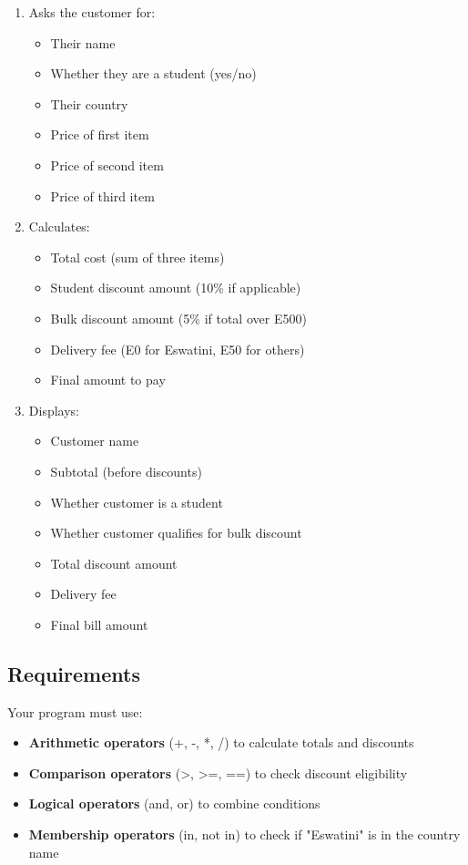 \documentclass[a4paper,11pt]{article}
\theoremstyle{mytheor}
\begin{document}
\begin{enumerate}
    \item Asks the customer for:
    \begin{itemize}
        \item Their name
        \item Whether they are a student (yes/no)
        \item Their country
        \item Price of first item
        \item Price of second item
        \item Price of third item
    \end{itemize}
    
    \item Calculates:
    \begin{itemize}
        \item Total cost (sum of three items)
        \item Student discount amount (10\% if applicable)
        \item Bulk discount amount (5\% if total over E500)
        \item Delivery fee (E0 for Eswatini, E50 for others)
        \item Final amount to pay
    \end{itemize}
    
    \item Displays:
    \begin{itemize}
        \item Customer name
        \item Subtotal (before discounts)
        \item Whether customer is a student
        \item Whether customer qualifies for bulk discount
        \item Total discount amount
        \item Delivery fee
        \item Final bill amount
    \end{itemize}
\end{enumerate}

\subsection*{Requirements}

Your program must use:
\begin{itemize}
    \item \textbf{Arithmetic operators} (+, -, *, /) to calculate totals and discounts
    \item \textbf{Comparison operators} (>, >=, ==) to check discount eligibility
    \item \textbf{Logical operators} (and, or) to combine conditions
    \item \textbf{Membership operators} (in, not in) to check if "Eswatini" is in the country name
\end{itemize}
\end{document}
